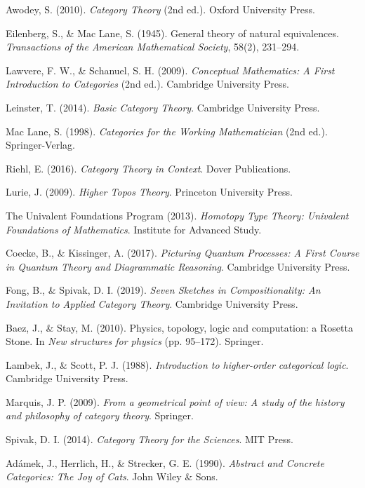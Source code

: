\documentclass[11pt,a4paper,twocolumn]{ltjsarticle}
\theoremstyle{definition}
\theoremstyle{plain}
\begin{document}
\begin{thebibliography}{99}

 Awodey, S. (2010). \textit{Category Theory} (2nd ed.). Oxford University Press.

 Eilenberg, S., \& Mac Lane, S. (1945). General theory of natural equivalences. \textit{Transactions of the American Mathematical Society}, 58(2), 231--294.

 Lawvere, F. W., \& Schanuel, S. H. (2009). \textit{Conceptual Mathematics: A First Introduction to Categories} (2nd ed.). Cambridge University Press.

 Leinster, T. (2014). \textit{Basic Category Theory}. Cambridge University Press.

 Mac Lane, S. (1998). \textit{Categories for the Working Mathematician} (2nd ed.). Springer-Verlag.

 Riehl, E. (2016). \textit{Category Theory in Context}. Dover Publications.

 Lurie, J. (2009). \textit{Higher Topos Theory}. Princeton University Press.

 The Univalent Foundations Program (2013). \textit{Homotopy Type Theory: Univalent Foundations of Mathematics}. Institute for Advanced Study.

 Coecke, B., \& Kissinger, A. (2017). \textit{Picturing Quantum Processes: A First Course in Quantum Theory and Diagrammatic Reasoning}. Cambridge University Press.

 Fong, B., \& Spivak, D. I. (2019). \textit{Seven Sketches in Compositionality: An Invitation to Applied Category Theory}. Cambridge University Press.

 Baez, J., \& Stay, M. (2010). Physics, topology, logic and computation: a Rosetta Stone. In \textit{New structures for physics} (pp. 95--172). Springer.

 Lambek, J., \& Scott, P. J. (1988). \textit{Introduction to higher-order categorical logic}. Cambridge University Press.

 Marquis, J. P. (2009). \textit{From a geometrical point of view: A study of the history and philosophy of category theory}. Springer.

 Spivak, D. I. (2014). \textit{Category Theory for the Sciences}. MIT Press.

 Adámek, J., Herrlich, H., \& Strecker, G. E. (1990). \textit{Abstract and Concrete Categories: The Joy of Cats}. John Wiley \& Sons.

\end{thebibliography}
\end{document}

